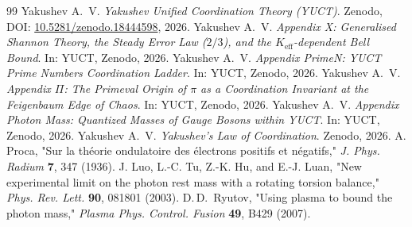 \documentclass[11pt,a4paper]{article}
\begin{document}
	\begin{thebibliography}{99}
		Yakushev A.~V. \emph{Yakushev Unified Coordination Theory (YUCT)}. Zenodo, DOI: \href{https://doi.org/10.5281/zenodo.18444598}{10.5281/zenodo.18444598}, 2026.
		Yakushev A.~V. \emph{Appendix X: Generalised Shannon Theory, the Steady Error Law ($2/3$), and the $K_{\mathrm{eff}}$-dependent Bell Bound}. In: YUCT, Zenodo, 2026.
		Yakushev A.~V. \emph{Appendix PrimeN: YUCT Prime Numbers Coordination Ladder}. In: YUCT, Zenodo, 2026.
		Yakushev A.~V. \emph{Appendix $\Pi$: The Primeval Origin of $\pi$ as a Coordination Invariant at the Feigenbaum Edge of Chaos}. In: YUCT, Zenodo, 2026.
		Yakushev A.~V. \emph{Appendix Photon Mass: Quantized Masses of Gauge Bosons within YUCT}. In: YUCT, Zenodo, 2026.
		Yakushev A.~V. \emph{Yakushev's Law of Coordination}. Zenodo, 2026.
		A. Proca, "Sur la théorie ondulatoire des électrons positifs et négatifs," \emph{J. Phys. Radium} \textbf{7}, 347 (1936).
		J. Luo, L.-C. Tu, Z.-K. Hu, and E.-J. Luan, "New experimental limit on the photon rest mass with a rotating torsion balance," \emph{Phys. Rev. Lett.} \textbf{90}, 081801 (2003).
		D.\,D.\ Ryutov, "Using plasma to bound the photon mass," \emph{Plasma Phys. Control. Fusion} \textbf{49}, B429 (2007).
	\end{thebibliography}
	
\end{document}
